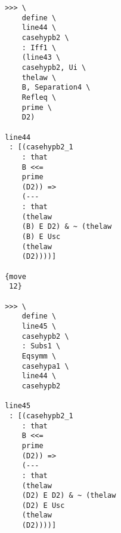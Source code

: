 \documentclass[12pt]{article}
\begin{document}
\begin{verbatim}
                                       >>> \
                                           define \
                                           line44 \
                                           casehypb2 \
                                           : Iff1 \
                                           (line43 \
                                           casehypb2, Ui \
                                           thelaw \
                                           B, Separation4 \
                                           Refleq \
                                           prime \
                                           D2)

                                       line44 
                                        : [(casehypb2_1 
                                           : that 
                                           B <<= 
                                           prime 
                                           (D2)) => 
                                           (--- 
                                           : that 
                                           (thelaw 
                                           (B) E D2) & ~ (thelaw 
                                           (B) E Usc 
                                           (thelaw 
                                           (D2))))]

                                       {move 
                                        12}

                                       >>> \
                                           define \
                                           line45 \
                                           casehypb2 \
                                           : Subs1 \
                                           Eqsymm \
                                           casehypa1 \
                                           line44 \
                                           casehypb2

                                       line45 
                                        : [(casehypb2_1 
                                           : that 
                                           B <<= 
                                           prime 
                                           (D2)) => 
                                           (--- 
                                           : that 
                                           (thelaw 
                                           (D2) E D2) & ~ (thelaw 
                                           (D2) E Usc 
                                           (thelaw 
                                           (D2))))]


\end{verbatim}
\end{document}
